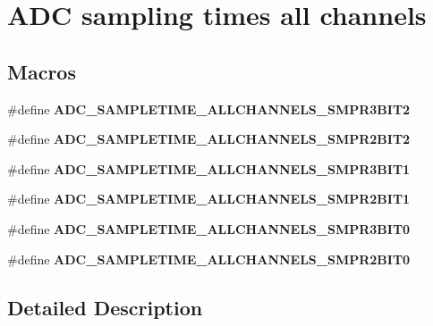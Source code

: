 \hypertarget{group___a_d_c__sampling__times__all__channels}{\section{A\-D\-C sampling times all channels}
\label{group___a_d_c__sampling__times__all__channels}
}
\subsection*{Macros}
\begin{DoxyCompactItemize}
\item 
\#define {\bfseries A\-D\-C\-\_\-\-S\-A\-M\-P\-L\-E\-T\-I\-M\-E\-\_\-\-A\-L\-L\-C\-H\-A\-N\-N\-E\-L\-S\-\_\-\-S\-M\-P\-R3\-B\-I\-T2}
\item 
\#define {\bfseries A\-D\-C\-\_\-\-S\-A\-M\-P\-L\-E\-T\-I\-M\-E\-\_\-\-A\-L\-L\-C\-H\-A\-N\-N\-E\-L\-S\-\_\-\-S\-M\-P\-R2\-B\-I\-T2}
\item 
\#define {\bfseries A\-D\-C\-\_\-\-S\-A\-M\-P\-L\-E\-T\-I\-M\-E\-\_\-\-A\-L\-L\-C\-H\-A\-N\-N\-E\-L\-S\-\_\-\-S\-M\-P\-R3\-B\-I\-T1}
\item 
\#define {\bfseries A\-D\-C\-\_\-\-S\-A\-M\-P\-L\-E\-T\-I\-M\-E\-\_\-\-A\-L\-L\-C\-H\-A\-N\-N\-E\-L\-S\-\_\-\-S\-M\-P\-R2\-B\-I\-T1}
\item 
\#define {\bfseries A\-D\-C\-\_\-\-S\-A\-M\-P\-L\-E\-T\-I\-M\-E\-\_\-\-A\-L\-L\-C\-H\-A\-N\-N\-E\-L\-S\-\_\-\-S\-M\-P\-R3\-B\-I\-T0}
\item 
\#define {\bfseries A\-D\-C\-\_\-\-S\-A\-M\-P\-L\-E\-T\-I\-M\-E\-\_\-\-A\-L\-L\-C\-H\-A\-N\-N\-E\-L\-S\-\_\-\-S\-M\-P\-R2\-B\-I\-T0}
\end{DoxyCompactItemize}


\subsection{Detailed Description}


